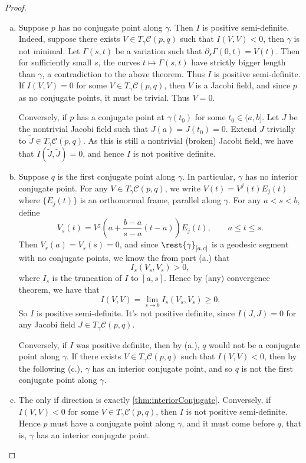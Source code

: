 \begin{proof}
\begin{enumerate}[a.]
\item 	Suppose $p$ has no conjugate point along $\gamma$.  Then $I$ is positive semi-definite.  Indeed, suppose there exists $V\in T_\gamma\mathcal{C}(p,q)$ such that $I(V,V)<0$, then $\gamma$ is not minimal.  Let $\Gamma(s,t)$ be a variation such that $\partial_s\Gamma(0,t)=V(t)$.  Then for sufficiently small $s$, the curves $t\mapsto\Gamma(s,t)$ have strictly bigger length than $\gamma$, a contradiction to the above theorem.  Thus $I$ is positive semi-definite.  If $I(V,V)=0$ for some $V\in T_\gamma\mathcal{C}(p,q)$, then $V$ is a Jacobi field, and since $p$ as no conjugate points, it must be trivial.  Thus $V=0$.

	Conversely, if $p$ has a conjugate point at $\gamma(t_0)$ for some $t_0\in(a,b]$.  Let $J$ be the nontrivial Jacobi field such that $J(a)=J(t_0)=0$.  Extend $J$ trivially to $\tilde{J}\in T_\gamma\mathcal{C}(p,q)$.  As this is still a nontrivial (broken) Jacobi field, we have that $I(\tilde{J},\tilde{J})=0$, and hence $I$ is not positive definite.
	
\item Suppose $q$ is the first conjugate point along $\gamma$.  In particular, $\gamma$ has no interior conjugate point.  For any $V\in T_\gamma\mathcal{C}(p,q)$, we write $V(t)=V^j(t)E_j(t)$ where $\{E_j(t)\}$ is an orthonormal frame, parallel along $\gamma$.  For any $a<s<b$, define
	$$V_s(t)=V^j\left(a+\frac{b-a}{s-a}(t-a)\right)E_j(t),\qquad a\leq t\leq s.$$
	Then $V_s(a)=V_s(s)=0$, and since $\rest{\gamma}_{[a,c]}$ is a geodesic segment with no conjugate points, we know the from part (a.) that
	$$I_s(V_s,V_s)>0,$$
	where $I_s$ is the truncation of $I$ to $[a,s]$.  Hence by (any) convergence theorem, we have that
	$$I(V,V)=\lim_{s\to b}I_s(V_s,V_s)\geq0.$$
	So $I$ is positive semi-definite.  It's not positive definite, since $I(J,J)=0$ for any Jacobi field $J\in T_\gamma\mathcal{C}(p,q)$.
	
	Conversely, if $I$ was positive definite, then by (a.), $q$ would not be a conjugate point along $\gamma$.  If there exists $V\in T_\gamma\mathcal{C}(p,q)$ such that $I(V,V)<0$, then by the following (c.), $\gamma$ has an interior conjugate point, and so $q$ is not the first conjugate point along $\gamma$.
	
\item The only if direction is exactly \cref{thm:interiorConjugate}.  Conversely, if $I(V,V)<0$ for some $V\in T_\gamma\mathcal{C}(p,q)$, then $I$ is not positive semi-definite.  Hence $p$ must have a conjugate point along $\gamma$, and it must come before $q$, that is, $\gamma$ has an interior conjugate point.
\end{enumerate}

\end{proof}


